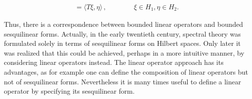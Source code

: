 \documentclass[12pt]{article}
\begin{document}
\begin{align*}
[\xi, \eta ] = \langle T \xi , \eta \rangle\,, \qquad\qquad \xi \in H_1, \eta \in H_2.
\end{align*}

Thus, there is a correspondence between bounded linear operators and bounded sesquilinear forms. Actually, in the early twentieth century, spectral theory was formulated solely in terms of sesquilinear forms on Hilbert spaces. Only later it was realized that this could be achieved, perhaps in a more intuitive manner, by considering linear operators instead. The linear operator approach has its advantages, as for example one can define the composition of linear operators but not of sesquilinear forms. Nevertheless it is many times useful to define a linear operator by specifying its sesquilinear form.
\end{document}
